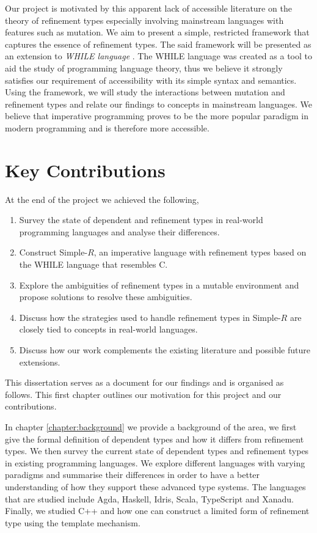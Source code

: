 \documentclass[a4paper,12pt]{report}
\begin{document}
\par
Our project is motivated by this apparent lack of accessible literature on the 
theory of refinement types especially involving mainstream languages 
with features such as mutation. We aim to present a simple, restricted framework that 
captures the essence of refinement types. The said framework will be presented as 
an extension to \textit{WHILE language} \cite{whileLanguage}. The WHILE language was 
created as a tool to aid the study of programming language theory, 
thus we believe it strongly satisfies our requirement of accessibility with 
its simple syntax and semantics. Using the 
framework, we will study the interactions between mutation and refinement types 
and relate our findings to concepts in mainstream languages. We believe that 
imperative programming proves to be the more popular paradigm in modern 
programming and is therefore more accessible. 


\section{Key Contributions}
At the end of the project we achieved the following, 
\begin{enumerate}
  \item Survey the state of dependent and refinement types in 
  real-world programming languages and analyse their differences.
  \item Construct Simple-$R$, an imperative language with refinement types 
  based on the WHILE language that resembles C. 
  \item Explore the ambiguities of refinement types in a mutable environment 
  and propose solutions to resolve these ambiguities.
  \item Discuss how the strategies used to handle refinement types in 
  Simple-$R$ are closely tied to concepts in real-world languages.  
  \item Discuss how our work complements the existing literature and possible 
  future extensions.
\end{enumerate}

\par
This dissertation serves as a document for our findings and is organised as 
follows. This first chapter outlines our motivation for this project and our 
contributions. 

\par
In chapter \ref{chapter:background} we provide a background of the area, we 
first give the formal definition of dependent types and how it differs 
from refinement types. We then survey the current state of 
dependent types and refinement types in existing programming languages. 
We explore different languages with varying paradigms and summarise their 
differences in order to have a better understanding of how they 
support these advanced type systems. The languages that are studied include 
Agda, Haskell, Idris, Scala, TypeScript and Xanadu. Finally, we studied 
C++ and how one can construct a limited form of refinement type using the 
template mechanism. 
\end{document}
